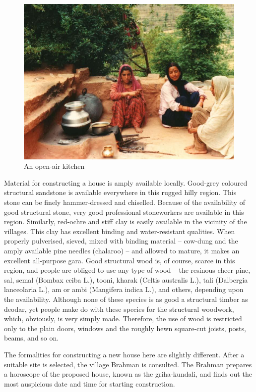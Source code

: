 \begin{figure}[!htbp]
\includegraphics[scale=.34]{images/chap02-12.jpg}
\caption{An open-air kitchen}\label{chap02-fig12}
\end{figure}

Material for constructing a house is amply available locally. Good-grey coloured structural sandstone is available everywhere in this rugged hilly region. This stone can be finely hammer-dressed and chiselled. Because of the availability of good structural stone, very good professional stoneworkers are available in this region. Similarly, red-ochre and stiff clay is easily available in the vicinity of the villages. This clay has excellent binding and water-resistant qualities. When properly pulverised, sieved, mixed with binding material – cow-dung and the amply available pine needles (chalaroo) – and allowed to mature, it makes an excellent all-purpose gara. Good structural wood is, of course, scarce in this region, and people are obliged to use any type of wood – the resinous cheer pine, sal, semal (Bombax ceiba L.), tooni, kharak (Celtis australis L.), tali (Dalbergia lanceolaria L.), am or ambi (Mangifera indica L.), and others, depending upon the availability. Although none of these species is as good a structural timber as deodar, yet people make do with these species for the structural woodwork, which, obviously, is very simply made. Therefore, the use of wood is restricted only to the plain doors, windows and the roughly hewn square-cut joists, posts, beams, and so on.

The formalities for constructing a new house here are slightly different. After a suitable site is selected, the village Brahman is consulted. The Brahman prepares a horoscope of the proposed house, known as the griha-kundali, and finds out the most auspicious date and time for starting construction.

